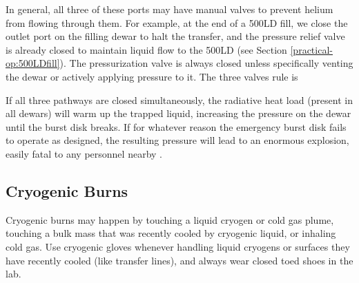 In general, all three of these ports may have manual valves to prevent helium from flowing through them.  For example, at the end of a 500LD fill, we close the outlet port on the filling dewar to halt the transfer, and the pressure relief valve is already closed to maintain liquid flow to the 500LD (see Section \ref{practical-op:500LDfill}).  The pressurization valve is always closed unless specifically venting the dewar or actively applying pressure to it.  The three valves rule is


If all three pathways are closed simultaneously, the radiative heat load (present in all dewars) will warm up the trapped liquid, increasing the pressure on the dewar until the burst disk breaks.  If for whatever reason the emergency burst disk fails to operate as designed, the resulting pressure will lead to an enormous explosion, easily fatal to any personnel nearby \cite{lnexplosion}. 

\subsection{Cryogenic Burns}
Cryogenic burns may happen by touching a liquid cryogen or cold gas plume, touching a bulk mass that was recently cooled by cryogenic liquid, or inhaling cold gas.  Use cryogenic gloves whenever handling liquid cryogens or surfaces they have recently cooled (like transfer lines), and always wear closed toed shoes in the lab.


\vspace{1cm}
\vspace{1cm}

